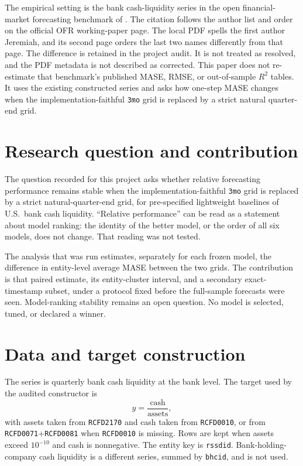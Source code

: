\documentclass[11pt]{article}
\begin{document}
The empirical setting is the bank cash-liquidity series in the open financial-market forecasting benchmark of \citet{bejarano2026ofr}. The citation follows the author list and order on the official OFR working-paper page. The local PDF spells the first author Jeremiah, and its second page orders the last two names differently from that page. The difference is retained in the project audit. It is not treated as resolved, and the PDF metadata is not described as corrected. This paper does not re-estimate that benchmark's published MASE, RMSE, or out-of-sample \(R^{2}\) tables. It uses the existing constructed series and asks how one-step MASE changes when the implementation-faithful \texttt{3mo} grid is replaced by a strict natural quarter-end grid.

\section{Research question and contribution}
\label{sec:question}

The question recorded for this project asks whether relative forecasting performance remains stable when the implementation-faithful \texttt{3mo} grid is replaced by a strict natural-quarter-end grid, for pre-specified lightweight baselines of U.S.\ bank cash liquidity. ``Relative performance'' can be read as a statement about model ranking: the identity of the better model, or the order of all six models, does not change. That reading was not tested.

The analysis that was run estimates, separately for each frozen model, the difference in entity-level average MASE between the two grids. The contribution is that paired estimate, its entity-cluster interval, and a secondary exact-timestamp subset, under a protocol fixed before the full-sample forecasts were seen. Model-ranking stability remains an open question. No model is selected, tuned, or declared a winner.

\section{Data and target construction}
\label{sec:data}

The series is quarterly bank cash liquidity at the bank level. The target used by the audited constructor is
\[
y = \frac{\text{cash}}{\text{assets}},
\]
with assets taken from \texttt{RCFD2170} and cash taken from \texttt{RCFD0010}, or from \texttt{RCFD0071}+\texttt{RCFD0081} when \texttt{RCFD0010} is missing. Rows are kept when assets exceed \(10^{-10}\) and cash is nonnegative. The entity key is \texttt{rssdid}. Bank-holding-company cash liquidity is a different series, summed by \texttt{bhcid}, and is not used.
\end{document}
